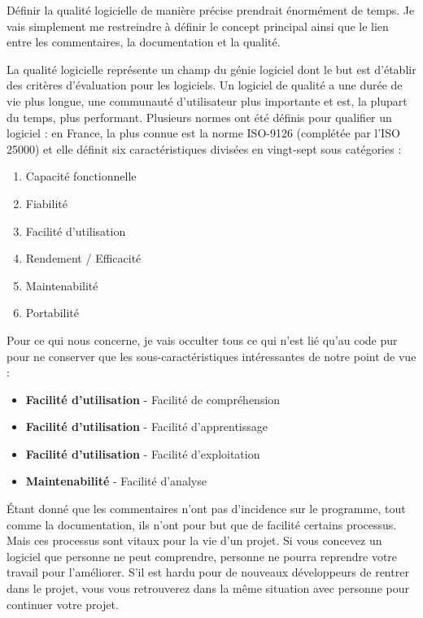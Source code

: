 \documentclass[10pt,a4paper,twoside, openany]{report}
\begin{document}
D\'efinir la qualit\'e logicielle de mani\`ere pr\'ecise prendrait \'enorm\'ement de temps. Je vais simplement me restreindre \`a d\'efinir le concept principal ainsi que le lien entre les commentaires, la documentation et la qualit\'e.\newline

La qualit\'e logicielle repr\'esente un champ du g\'enie logiciel dont le but est d'\'etablir des crit\`eres d'\'evaluation pour les logiciels. Un logiciel de qualit\'e a une dur\'ee de vie plus longue, une communaut\'e d'utilisateur plus importante et est, la plupart du temps, plus performant. Plusieurs normes ont \'et\'e d\'efinis pour qualifier un logiciel : en France, la plus connue est la norme ISO-9126 (compl\'et\'ee par l'ISO 25000) et elle d\'efinit six caract\'eristiques divis\'ees en vingt-sept sous cat\'egories :

\begin{enumerate}
\item{Capacit\'e fonctionnelle}
\item{Fiabilit\'e}
\item{Facilit\'e d'utilisation}
\item{Rendement / Efficacit\'e}
\item{Maintenabilit\'e}
\item{Portabilit\'e}
\end{enumerate}

Pour ce qui nous concerne, je vais occulter tous ce qui n'est li\'e qu'au code pur pour ne conserver que les sous-caract\'eristiques int\'eressantes de notre point de vue :

\begin{itemize}
\item{\textbf{Facilit\'e d'utilisation} - Facilit\'e de compr\'ehension}
\item{\textbf{Facilit\'e d'utilisation} - Facilit\'e d'apprentissage}
\item{\textbf{Facilit\'e d'utilisation} - Facilit\'e d'exploitation}
\item{\textbf{Maintenabilit\'e} - Facilit\'e d'analyse}
\end{itemize}

\'Etant donn\'e que les commentaires n'ont pas d'incidence sur le programme, tout comme la documentation, ils n'ont pour but que de facilit\'e certains processus. Mais ces processus sont vitaux pour la vie d'un projet. Si vous concevez un logiciel que personne ne peut comprendre, personne ne pourra reprendre votre travail pour l'am\'eliorer. S'il est hardu pour de nouveaux d\'eveloppeurs de rentrer dans le projet, vous vous retrouverez dans la m\^eme situation avec personne pour continuer votre projet.
\end{document}
